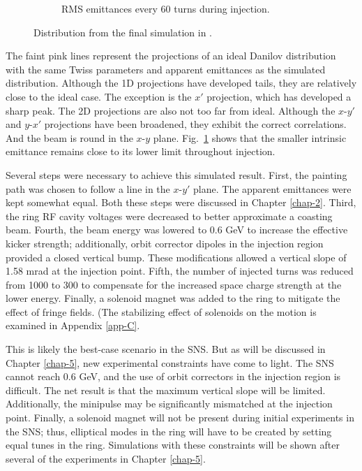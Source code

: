 \begin{figure}[!p]
\begin{subfigure}{0.5\textwidth}
        \caption{RMS emittances every 60 turns during injection.}
        \label{fig:Holmes_emittances}
    \end{subfigure}
    \caption{Distribution from the final simulation in \cite{Holmes2018}.}
    \label{fig:Holmes}
\end{figure}
%
The faint pink lines represent the projections of an ideal Danilov distribution with the same Twiss parameters and apparent emittances as the simulated distribution. Although the 1D projections have developed tails, they are relatively close to the ideal case. The exception is the $x'$ projection, which has developed a sharp peak. The 2D projections are also not too far from ideal. Although the $x$-$y'$ and $y$-$x'$ projections have been broadened, they exhibit the correct correlations. And the beam is round in the $x$-$y$ plane. Fig.~\ref{fig:Holmes_emittances} shows that the smaller intrinsic emittance remains close to its lower limit throughout injection.

Several steps were necessary to achieve this simulated result. First, the painting path was chosen to follow a line in the $x$-$y'$ plane. The apparent emittances were kept somewhat equal. Both these steps were discussed in Chapter \ref{chap-2}. Third, the ring RF cavity voltages were decreased to better approximate a coasting beam. Fourth, the beam energy was lowered to 0.6 GeV to increase the effective kicker strength; additionally, orbit corrector dipoles in the injection region provided a closed vertical bump. These modifications allowed a vertical slope of 1.58 mrad at the injection point. Fifth, the number of injected turns was reduced from 1000 to 300 to compensate for the increased space charge strength at the lower energy. Finally, a solenoid magnet was added to the ring to mitigate the effect of fringe fields. (The stabilizing effect of solenoids on the motion is examined in Appendix \ref{app-C}. 

This is likely the best-case scenario in the SNS. But as will be discussed in Chapter \ref{chap-5}, new experimental constraints have come to light. The SNS cannot reach 0.6 GeV, and the use of orbit correctors in the injection region is difficult. The net result is that the maximum vertical slope will be limited. Additionally, the minipulse may be significantly mismatched at the injection point. Finally, a solenoid magnet will not be present during initial experiments in the SNS; thus, elliptical modes in the ring will have to be created by setting equal tunes in the ring. Simulations with these constraints will be shown after several of the experiments in Chapter \ref{chap-5}.